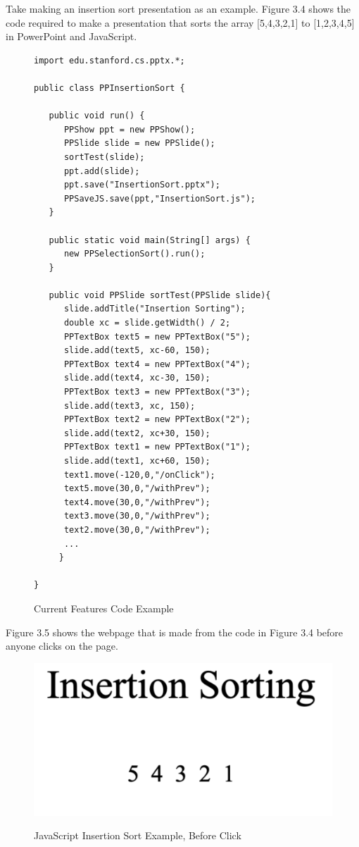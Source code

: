 \documentclass[12pt,twoside]{reedthesis}
\begin{document}
Take making an insertion sort presentation as an example. Figure 3.4 shows the code required to make a presentation that sorts the array [5,4,3,2,1] to [1,2,3,4,5] in PowerPoint and JavaScript.
\begin{figure}[h!tbp]
\caption{Current Features Code Example} 
\begin{lstlisting}[escapechar=!]
import edu.stanford.cs.pptx.*;

public class PPInsertionSort {

   public void run() {
      PPShow ppt = new PPShow();
      PPSlide slide = new PPSlide();
      sortTest(slide);
      ppt.add(slide);
      ppt.save("InsertionSort.pptx");
      PPSaveJS.save(ppt,"InsertionSort.js");
   }

   public static void main(String[] args) {
      new PPSelectionSort().run();
   }
   
   public void PPSlide sortTest(PPSlide slide){
      slide.addTitle("Insertion Sorting");
      double xc = slide.getWidth() / 2;
      PPTextBox text5 = new PPTextBox("5");
      slide.add(text5, xc-60, 150);
      PPTextBox text4 = new PPTextBox("4");
      slide.add(text4, xc-30, 150);
      PPTextBox text3 = new PPTextBox("3");
      slide.add(text3, xc, 150);
      PPTextBox text2 = new PPTextBox("2");
      slide.add(text2, xc+30, 150);
      PPTextBox text1 = new PPTextBox("1");
      slide.add(text1, xc+60, 150);
      text1.move(-120,0,"/onClick");
      text5.move(30,0,"/withPrev");
      text4.move(30,0,"/withPrev");
      text3.move(30,0,"/withPrev");
      text2.move(30,0,"/withPrev");
      ...
     }
	
}
\end{lstlisting}
\end{figure} 
Figure 3.5 shows the webpage that is made from the code in Figure 3.4 before anyone clicks on the page.
\begin{figure}[htbp] 
\begin{centering} 
\caption{JavaScript Insertion Sort Example, Before Click} 
\includegraphics[scale=0.7]{insbefore} 
\label{subd}
\end{centering} 
\end{figure}
\end{document}
